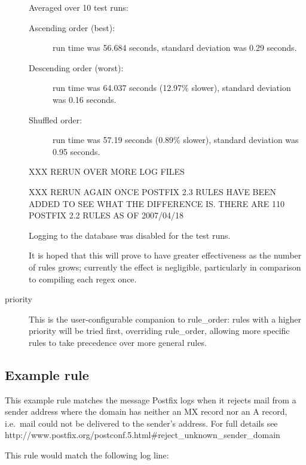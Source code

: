 \documentclass[a4paper,12pt,draft]{article}
\begin{document}
\begin{description}
        Averaged over 10 test runs:

        \begin{description} 

            \item [Ascending order (best):] run time was 56.684 seconds,
                standard deviation was 0.29 seconds.

            \item [Descending order (worst):] run time was 64.037
                seconds (12.97\% slower), standard deviation was 0.16
                seconds.

            \item [Shuffled order:] run time was 57.19 seconds
                (0.89\% slower), standard deviation was 0.95 seconds.

        \end{description}

        XXX RERUN OVER MORE LOG FILES

        XXX RERUN AGAIN ONCE POSTFIX 2.3 RULES HAVE BEEN ADDED TO SEE WHAT
        THE DIFFERENCE IS.  THERE ARE 110 POSTFIX 2.2 RULES AS OF
        2007/04/18

        Logging to the database was disabled for the test runs.

        It is hoped that this will prove to have greater effectiveness as
        the number of rules grows; currently the effect is negligible,
        particularly in comparison to compiling each regex once.

    \item [priority] This is the user-configurable companion to
        rule\_order: rules with a higher priority will be tried first,
        overriding rule\_order, allowing more specific rules to take
        precedence over more general rules.

\end{description}


\subsection{Example rule}

This example rule matches the message Postfix logs when it rejects mail
from a sender address where the domain has neither an MX record nor an A
record, i.e.\ mail could not be delivered to the sender's address.  For full
details see
http://www.postfix.org/postconf.5.html\#reject\_unknown\_sender\_domain

This rule would match the following log line:
\end{document}
